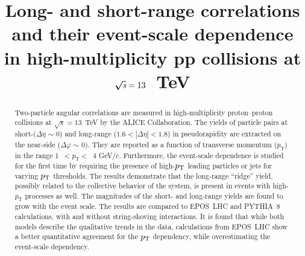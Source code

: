 \documentclass[ALICE,manyauthors]{cernphprep}
\begin{document}
\begin{titlepage}

\PHyear{}
\PHdate{\today}
%

\title{Long- and short-range correlations and their event-scale dependence in high-multiplicity pp collisions at $\boldsymbol{\sqrt{{\textit s}}}=13$~TeV}


\begin{abstract}
Two-particle angular correlations are measured in high-multiplicity proton--proton collisions at $\sqrt{s} =13$~TeV by the ALICE Collaboration. The yields of particle pairs at short-($\Delta\eta$ $\sim$ 0) and long-range ($1.6 < |\Delta\eta| < 1.8$) in pseudorapidity are extracted on the near-side ($\Delta\varphi$ $\sim$ 0).
They are reported as a function of transverse momentum ($p_{\mathrm T}$) in the range 1~$<p_{\mathrm T}<$~4 GeV/$c$.
Furthermore, the event-scale dependence is studied for the first time by requiring the presence of high-$p_{\rm T}$ leading particles or jets for varying $p_{\rm T}$ thresholds. 
The results demonstrate that the long-range ``ridge'' yield, possibly related to the collective behavior of the system, is present in events with high-$p_{\mathrm T}$ processes as well. The magnitudes of the short- and long-range yields are found to grow with the event scale. 
The results are compared to EPOS~LHC and PYTHIA~8 calculations, with and without string-shoving interactions. It is found that while both models describe the qualitative trends in the data, calculations from EPOS~LHC show a better quantitative agreement for the $p_{\rm T}$ dependency, while overestimating the event-scale dependency.
\end{abstract}

\end{titlepage}

\setcounter{page}{2}





\end{document}
